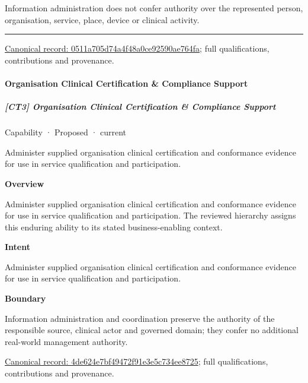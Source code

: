Information administration does not confer authority over the represented person, organisation, service, place, device or clinical activity.



\medskip\hrule\medskip

{\footnotesize \href{../../../../continuum/strategy/capability/0511a705d74a4f48a0ce92590ae764fa.md}{Canonical record: 0511a705d74a4f48a0ce92590ae764fa}; full qualifications, contributions and provenance.}\par
\paragraph{Organisation Clinical Certification \& Compliance Support}

\subparagraph{[CT3] Organisation Clinical Certification \& Compliance Support}

\label{element:4de624e7bf49472f91e3e5c734ee8725}
{\small Capability · Proposed · current}\par

Administer supplied organisation clinical certification and conformance evidence for use in service qualification and participation.



\textbf{Overview}



Administer supplied organisation clinical certification and conformance evidence for use in service qualification and participation. The reviewed hierarchy assigns this enduring ability to its stated business-enabling context.



\textbf{Intent}



Administer supplied organisation clinical certification and conformance evidence for use in service qualification and participation.



\textbf{Boundary}



Information administration and coordination preserve the authority of the responsible source, clinical actor and governed domain; they confer no additional real-world management authority.


{\footnotesize \href{../../../../continuum/strategy/capability/4de624e7bf49472f91e3e5c734ee8725.md}{Canonical record: 4de624e7bf49472f91e3e5c734ee8725}; full qualifications, contributions and provenance.}\par
